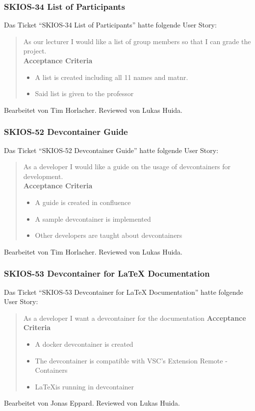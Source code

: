 \subsubsection{SKIOS-34 List of Participants}
Das Ticket \enquote{SKIOS-34 List of Participants} hatte folgende User Story:
\begin{quotation}
    As our lecturer I would like a list of group members so that I can grade the project. \\
    \textbf{Acceptance Criteria}
    \begin{itemize}
        \item A list is created including all 11 names and matnr.
        \item Said list is given to the professor
    \end{itemize}
\end{quotation}
Bearbeitet von Tim Horlacher.
Reviewed von Lukas Huida.

\subsubsection{SKIOS-52 Devcontainer Guide}
Das Ticket \enquote{SKIOS-52 Devcontainer Guide} hatte folgende User Story:
\begin{quotation}
    As a developer I would like a guide on the usage of devcontainers for development. \\
    \textbf{Acceptance Criteria}
    \begin{itemize}
        \item A guide is created in confluence
        \item A sample devcontainer is implemented
        \item Other developers are taught about devcontainers 
    \end{itemize}
\end{quotation}
Bearbeitet von Tim Horlacher.
Reviewed von Lukas Huida.

\subsubsection{SKIOS-53 Devcontainer for LaTeX Documentation}
Das Ticket \enquote{SKIOS-53 Devcontainer for LaTeX Documentation} hatte folgende User Story:
\begin{quotation}
    As a developer I want a devcontainer for the documentation
\textbf{Acceptance Criteria}
\begin{itemize}
    \item A docker devcontainer is created
    \item The devcontainer is compatible with \ac{VSC}'s Extension Remote - Containers
    \item \LaTeX is running in devcontainer
\end{itemize}
\end{quotation}
Bearbeitet von Jonas Eppard.
Reviewed von Lukas Huida.


